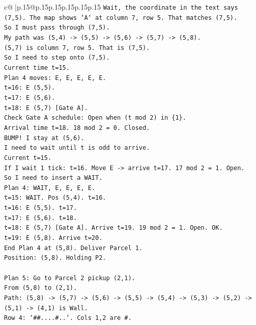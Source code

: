 \documentclass{article}
\begin{document}
{\begin{supertabular}{c@{$\;$}|p{.15\linewidth}@{}p{.15\linewidth}p{.15\linewidth}p{.15\linewidth}p{.15\linewidth}p{.15\linewidth}}
{{{\texttt{Wait, the coordinate in the text says (7,5). The map shows `A` at column 7, row 5. That matches (7,5).} \\
\texttt{So I must pass through (7,5).} \\
\texttt{My path was (5,4) {-}> (5,5) {-}> (5,6) {-}> (5,7) {-}> (5,8).} \\
\texttt{(5,7) is column 7, row 5. That is (7,5).} \\
\texttt{So I need to step onto (7,5).} \\
\texttt{Current time t=15.} \\
\texttt{Plan 4 moves: E, E, E, E, E.} \\
\texttt{t=16: E (5,5).} \\
\texttt{t=17: E (5,6).} \\
\texttt{t=18: E (5,7) {[}Gate A{]}.} \\
\texttt{Check Gate A schedule: Open when (t mod 2) in \{1\}.} \\
\texttt{Arrival time t=18. 18 mod 2 = 0. Closed.} \\
\texttt{BUMP! I stay at (5,6).} \\
\texttt{I need to wait until t is odd to arrive.} \\
\texttt{Current t=15.} \\
\texttt{If I wait 1 tick: t=16. Move E {-}> arrive t=17. 17 mod 2 = 1. Open.} \\
\texttt{So I need to insert a WAIT.} \\
\texttt{Plan 4: WAIT, E, E, E, E.} \\
\texttt{t=15: WAIT. Pos (5,4). t=16.} \\
\texttt{t=16: E (5,5). t=17.} \\
\texttt{t=17: E (5,6). t=18.} \\
\texttt{t=18: E (5,7) {[}Gate A{]}. Arrive t=19. 19 mod 2 = 1. Open. OK.} \\
\texttt{t=19: E (5,8). Arrive t=20.} \\
\texttt{End Plan 4 at (5,8). Deliver Parcel 1.} \\
\texttt{Position: (5,8). Holding P2.} \\
\\ 
\texttt{Plan 5: Go to Parcel 2 pickup (2,1).} \\
\texttt{From (5,8) to (2,1).} \\
\texttt{Path: (5,8) {-}> (5,7) {-}> (5,6) {-}> (5,5) {-}> (5,4) {-}> (5,3) {-}> (5,2) {-}> (5,1) {-}> (4,1) is Wall.} \\
\texttt{Row 4: `\#\#....\#..`. Cols 1,2 are \#.} \\
}}}
\end{supertabular}}
\end{document}
